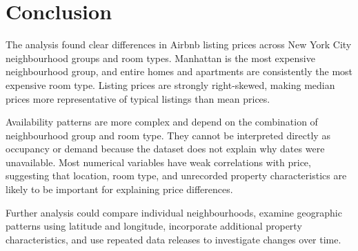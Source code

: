 \section{Conclusion}

The analysis found clear differences in Airbnb listing prices across New York
City neighbourhood groups and room types. Manhattan is the most expensive
neighbourhood group, and entire homes and apartments are consistently the most
expensive room type. Listing prices are strongly right-skewed, making median
prices more representative of typical listings than mean prices.

Availability patterns are more complex and depend on the combination of
neighbourhood group and room type. They cannot be interpreted directly as
occupancy or demand because the dataset does not explain why dates were
unavailable. Most numerical variables have weak correlations with price,
suggesting that location, room type, and unrecorded property characteristics
are likely to be important for explaining price differences.

Further analysis could compare individual neighbourhoods, examine geographic
patterns using latitude and longitude, incorporate additional property
characteristics, and use repeated data releases to investigate changes over
time.